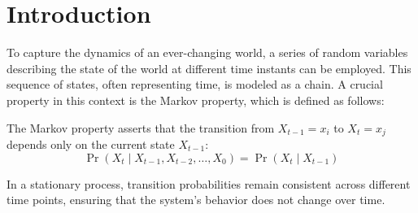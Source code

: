 \section{Introduction}

To capture the dynamics of an ever-changing world, a series of random variables describing the state of the world at different time instants can be employed. 
This sequence of states, often representing time, is modeled as a chain. 
A crucial property in this context is the Markov property, which is defined as follows:
\begin{property}
    The Markov property asserts that the transition from $X_{t-1}=x_i$ to $X_t=x_j$ depends only on the current state $X_{t-1}$: 
    \[\Pr\left(X_t\mid X_{t-1},X_{t-2},\dots,X_0\right)=\Pr(X_t\mid X_{t-1})\] 
\end{property}
In a stationary process, transition probabilities remain consistent across different time points, ensuring that the system's behavior does not change over time.